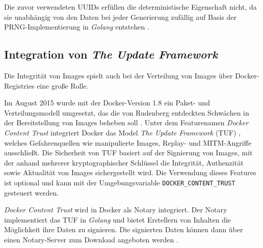 \documentclass[../main.tex]{subfiles}
\begin{document}
      Die zuvor verwendeten UUIDs erfüllen die deterministische Eigenschaft nicht, da sie unabhängig von den Daten bei jeder Generierung zufällig auf Basis der PRNG-Implementierung in \emph{Golang} entstehen \cite{githubImageUUID}.




    \subsection{Integration von \emph{The Update Framework}}
    \label{tuf}
      Die Integrität von Images spielt auch bei der Verteilung von Images über Docker-Registries eine große Rolle.

      Im August 2015 wurde mit der Docker-Version 1.8 ein Paket- und Verteilungsmodell umgesetzt, das die von Rudenberg entdeckten Schwächen in der Bereitstellung von Images beheben soll \cite{dockerContentTrust}. Unter dem Featurenamen \emph{Docker Content Trust} integriert Docker das Model \emph{The Update Framework} (TUF) \cite{tufFramework}, welches Gefahrenquellen wie manipulierte Images, Replay- und MITM-Angriffe ausschließt. Die Sicherheit von TUF basiert auf der Signierung von Images, mit der anhand mehrerer kryptographischer Schlüssel die Integrität, Authenzität sowie Aktualität von Images sichergestellt wird. Die Verwendung dieses Features ist optional und kann mit der Umgebungsvariable \texttt{DOCKER\_CONTENT\_TRUST} gesteuert werden.

      \emph{Docker Content Trust} wird in Docker als Notary integriert. Der Notary implementiert das TUF in \emph{Golang} und bietet Erstellern von Inhalten die Möglichkeit ihre Daten zu signieren. Die signierten Daten können dann über einen Notary-Server zum Download angeboten werden \cite{githubNotary}\cite{dockerContentTrust}.
\end{document}
